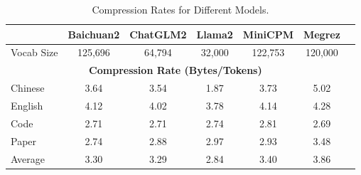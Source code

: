 \begin{table}[h]
\centering
\caption{Compression Rates for Different Models.}
\label{tokenizer_compression_rate}
\begin{tabular}{lcccccc}
\toprule
 & Baichuan2 & ChatGLM2 & Llama2 & MiniCPM & Megrez \\
\midrule
Vocab Size & 125,696 & 64,794 & 32,000 & 122,753 & 120,000 \\
\midrule
\multicolumn{6}{c}{\textbf{Compression Rate (Bytes/Tokens)}} \\
\midrule
Chinese & 3.64 & 3.54 & 1.87 & 3.73 & 5.02 \\
English & 4.12 & 4.02 & 3.78 & 4.14 & 4.28 \\
Code & 2.71 & 2.71 & 2.74 & 2.81 & 2.69 \\
Paper & 2.74 & 2.88 & 2.97 & 2.93 & 3.48 \\
\midrule
Average & 3.30 & 3.29 & 2.84 & 3.40 & 3.86 \\
\bottomrule
\end{tabular}
\end{table}